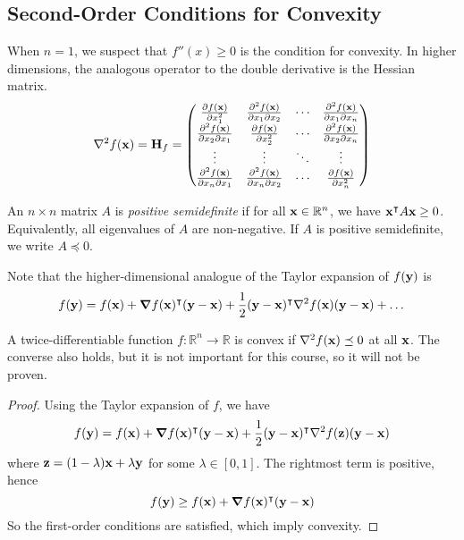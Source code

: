 \subsection{Second-Order Conditions for Convexity}
When \(n = 1\), we suspect that \(f''(x) \geq 0\) is the condition for convexity.
In higher dimensions, the analogous operator to the double derivative is the Hessian matrix.
\[
	\laplacian{f(\vb x)} = \vb H_f = \begin{pmatrix}
		\pdv{f(\vb x)}{x_1^2}    & \pdv{f(\vb x)}{x_1}{x_2} & \cdots & \pdv{f(\vb x)}{x_1}{x_n} \\
		\pdv{f(\vb x)}{x_2}{x_1} & \pdv{f(\vb x)}{x_2^2}    & \cdots & \pdv{f(\vb x)}{x_2}{x_n} \\
		\vdots                   & \vdots                   & \ddots & \vdots                   \\
		\pdv{f(\vb x)}{x_n}{x_1} & \pdv{f(\vb x)}{x_n}{x_2} & \cdots & \pdv{f(\vb x)}{x_n^2}    \\
	\end{pmatrix}
\]
\begin{definition}
	An \(n \times n\) matrix \(A\) is \textit{positive semidefinite} if for all \(\vb x \in \mathbb R^n\), we have \(\vb x^\intercal A \vb x \geq 0\).
	Equivalently, all eigenvalues of \(A\) are non-negative.
	If \(A\) is positive semidefinite, we write \(A \preceq 0\).
\end{definition}
Note that the higher-dimensional analogue of the Taylor expansion of \(f(\vb y)\) is
\[
	f(\vb y) = f(\vb x) + \grad{f(\vb x)}^\transpose (\vb y - \vb x) + \frac{1}{2}(\vb y - \vb x)^\transpose \laplacian{f(\vb x)} (\vb y - \vb x) + \dots
\]
\begin{theorem}
	A twice-differentiable function \(f \colon \mathbb R^n \to \mathbb R\) is convex if \(\laplacian{f(\vb x)} \preceq 0\) at all \(\vb x\).
	The converse also holds, but it is not important for this course, so it will not be proven.
\end{theorem}
\begin{proof}
	Using the Taylor expansion of \(f\), we have
	\[
		f(\vb y) = f(\vb x) + \grad{f(\vb x)}^\transpose (\vb y - \vb x) + \frac{1}{2}(\vb y - \vb x)^\transpose \laplacian{f(\vb z)} (\vb y - \vb x)
	\]
	where \(\vb z = (1-\lambda)\vb x + \lambda \vb y\) for some \(\lambda \in [0, 1]\).
	The rightmost term is positive, hence
	\[
		f(\vb y) \geq f(\vb x) + \grad{f(\vb x)}^\intercal (\vb y - \vb x)
	\]
	So the first-order conditions are satisfied, which imply convexity.
\end{proof}
